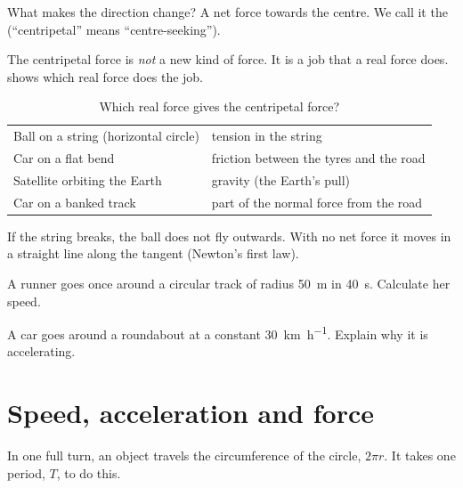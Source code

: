 What makes the direction change? A net force towards the centre. We call it the
 (``centripetal'' means ``centre-seeking'').

The centripetal force is \emph{not} a new kind of force. It is a job that a real
force does.  shows which real force does the job.

\begin{table}
  \caption{Which real force gives the centripetal force?}\label{ch2:tab:forces}
  \centering
  \begin{tabular}{@{}L{55mm}L{70mm}@{}}
    \toprule
     & \\
    \midrule
    Ball on a string (horizontal circle) & tension in the string\\
    Car on a flat bend & friction between the tyres and the road\\
    Satellite orbiting the Earth & gravity (the Earth's pull)\\
    Car on a banked track & part of the normal force from the road\\
    \bottomrule
  \end{tabular}
\end{table}

If the string breaks, the ball does not fly outwards. With no net force it
moves in a straight line along the tangent (Newton's first law).

\begin{quickcheck}
  \item A runner goes once around a circular track of radius \qty{50}{m} in
        \qty{40}{s}. Calculate her speed.
  \item A car goes around a roundabout at a constant \qty{30}{km.h^{-1}}.
        Explain why it is accelerating.\label{ch2:qc:roundabout}
\end{quickcheck}

\section{Speed, acceleration and force}\label{ch2:sec:formulas}

In one full turn, an object travels the circumference of the circle, $2\pi r$.
It takes one period, $T$, to do this.

